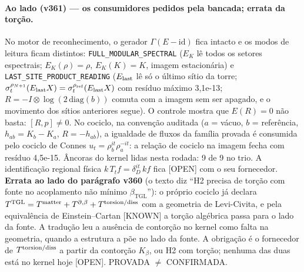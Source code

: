 \documentclass[11pt]{article}
\newcommand{\bTGL}{\beta_{\mathrm{TGL}}}\newcommand{\Msun}{M_{\odot}}\newcommand{\TGL}{\mathrm{TGL}}
\theoremstyle{definition}\newtheorem{deriv}{Derivação}
\begin{document}
\paragraph*{Ao lado (v361) --- os consumidores pedidos pela bancada; errata da torção.} No motor de reconhecimento, o gerador $\Gamma(E-\mathrm{id})$ fica intacto e os modos de leitura ficam distintos: \texttt{FULL\_MODULAR\_SPECTRAL} ($E_K$ lê todos os setores espectrais; $E_K(\rho)=\rho$, $E_K(K)=K$, imagem estacionária) e \texttt{LAST\_SITE\_PRODUCT\_READING} ($E_{\rm last}$ lê só o último sítio da torre; $\sigma^{\rho_{N+1}}_t(E_{\rm last}X)=\sigma^{\rho_{\rm ref}}_t(E_{\rm last}X)$ com resíduo máximo 3,1e-13; $R=-I\otimes\log(2\,\mathrm{diag}(b))$ comuta com a imagem sem ser apagado, e o movimento dos sítios anteriores segue). O controle mostra que $E(R)=0$ não basta: $[R,p]\neq0$. No cociclo, na convenção auditada ($a$ = vácuo, $b$ = referência, $h_{ab}=K_b-K_a$, $R=-h_{ab}$), a igualdade de fluxos da família provada é consumida pelo cociclo de Connes $u_t=\rho_b^{it}\rho_a^{-it}$: a relação de cociclo na imagem fecha com resíduo 4,5e-15. Âncoras do kernel lidas nesta rodada: 9 de 9 no trio. A identificação regional física $k\,T_tf=\delta_D^{it}\,kf$ fica [OPEN] com o seu fornecedor. \textbf{Errata ao lado do parágrafo v360} (o texto diz ``H2 precisa de torção com fonte no acoplamento não mínimo $\bTGL$''): o próprio cociclo já declara $T^{\rm TGL}=T^{\rm matter}+T^{\partial,\beta}+T^{\rm torsion/diss}$ com a geometria de Levi-Civita, e pela equivalência de Einstein--Cartan [KNOWN] a torção algébrica passa para o lado da fonte. A tradução leu a ausência de contorção no kernel como falta na geometria, quando a estrutura a põe no lado da fonte. A obrigação é o fornecedor de $T^{\rm torsion/diss}$ a partir da contorção $K_\beta$, ou H2 com torção; nenhuma das duas está no kernel hoje [OPEN]. PROVADA $\neq$ CONFIRMADA.
\end{document}
